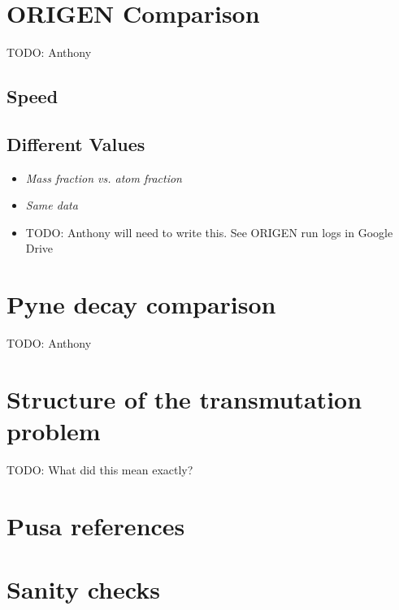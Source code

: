 \documentclass{article}
\makeatletter
\newcommand\todo[1]{{\color{red}TODO\@: #1}}
\makeatother
\begin{document}
\section{ORIGEN Comparison}
\todo{Anthony}
\subsection{Speed}
\label{sec:origen-speed}

\subsection{Different Values}
\begin{itemize}
\item \it{Mass fraction vs. atom fraction}
\item \it{Same data}
\item \todo{Anthony will need to write this. See ORIGEN run logs in Google Drive}
\end{itemize}

\section{Pyne decay comparison}
\todo{Anthony}

\section{Structure of the transmutation problem}
\todo{What did this mean exactly?}

\section{Pusa references}

\section{Sanity checks}



\end{document}
